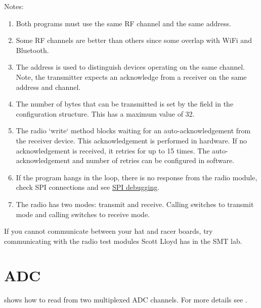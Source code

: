 Notes:
%
\begin{enumerate}
\item Both programs must use the same RF channel and the same address.

\item Some RF channels are better than others since some overlap with
  WiFi and Bluetooth.

\item The address is used to distinguish devices operating on the same
  channel. Note, the transmitter expects an acknowledge from a
  receiver on the same address and channel.

\item The number of bytes that can be transmitted is set by the
   field in the configuration structure.  This has a
  maximum value of 32.

\item The radio `write` method blocks waiting for an
  auto-acknowledgement from the receiver device. This acknowledgement
  is performed in hardware. If no acknowledgement is received, it
  retries for up to 15 times. The auto-acknowledgement and number of
  retries can be configured in software.

\item If the program hangs in the  loop, there is no
  response from the radio module, check SPI connections and see
  \hyperref[debugging_Spi]{SPI debugging}.

\item The radio has two modes: transmit and receive.  Calling
   switches to transmit mode and calling
   switches to receive mode.

\end{enumerate}

If you cannot communicate between your hat and racer boards, try
communicating with the radio test modules Scott Lloyd has in the SMT
lab.


\section{ADC}
\label{ADC}

 shows
how to read from two multiplexed ADC channels.  For more details
see .

\inputminted{C}{../../src/test-apps/adc_usb_serial_test2/adc_usb_serial_test2.c}

